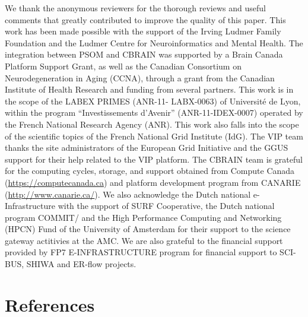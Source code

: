 \documentclass[preprint,3p,twocolumn]{elsarticle}
\newcommand{\correction}[1]{\color{blue}#1\color{black}\xspace}
\begin{document}
\correction{We thank the anonymous reviewers for the thorough reviews and useful comments that greatly contributed to improve the quality of this paper.} This work has been made possible with the support of the Irving Ludmer
Family Foundation and the Ludmer Centre for Neuroinformatics and
Mental Health. The integration between PSOM and CBRAIN was supported
by a Brain Canada Platform Support Grant, as well as the Canadian
Consortium on Neurodegeneration in Aging (CCNA), through a grant from
the Canadian Institute of Health Research and funding from several
partners.  This work is in the scope of the LABEX PRIMES (ANR-11-
LABX-0063) of Universit\'e de Lyon, within the program
``Investissements d'Avenir'' (ANR-11-IDEX-0007) operated by the French
National Research Agency (ANR). This work also falls into the scope of
the scientific topics of the French National Grid Institute (IdG). The
VIP team thanks the site administrators of the European Grid
Initiative and the GGUS support for their help related to the VIP
platform. The CBRAIN team is grateful for the computing cycles,
storage, and support obtained from Compute Canada
(\url{https://computecanada.ca}) and platform development program from
CANARIE (\url{http://www.canarie.ca/}). We also acknowledge the Dutch
national e-Infrastructure with the support of SURF Cooperative, the
Dutch national program COMMIT/ and the High Performance Computing and
Networking (HPCN) Fund of the University of Amsterdam for their
support to the science gateway actitivies at the AMC.  We are also
grateful to the financial support provided by FP7 E-INFRASTRUCTURE
program for financial support to SCI-BUS, SHIWA and ER-flow
projects. 

\section*{References}

\enlargethispage{5mm}


\end{document}
